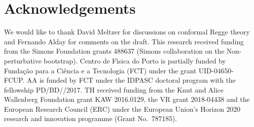 
\section{Acknowledgements}
\label{sec:ack}

We would like to thank David Meltzer for discussions on conformal Regge theory and Fernando Alday for comments on the draft. 
This research received funding from the Simons Foundation grants 488637  (Simons collaboration on the Non-perturbative bootstrap).
Centro de F\'\i sica do Porto is partially funded by Funda\c c\~ao para a Ci\^encia e a Tecnologia (FCT) under the grant
UID-04650-FCUP.
AA is funded by FCT under the IDPASC doctoral program with the fellowship  PD/BD//2017.
TH received funding from the Knut and Alice Wallenberg Foundation grant KAW 2016.0129, the VR grant 2018-04438 and the European Research Council (ERC) under the European Union’s Horizon
2020 research and innovation programme (Grant No.\ 787185).
